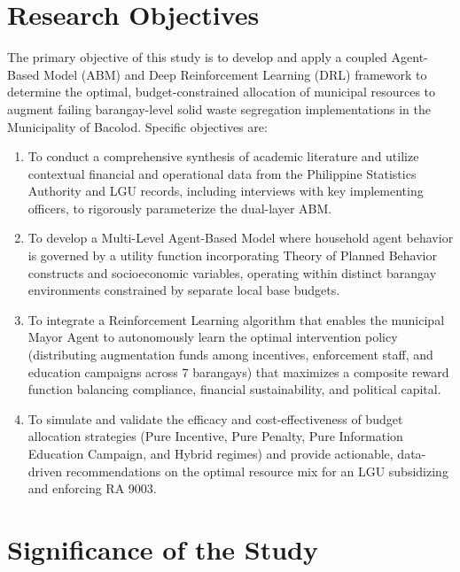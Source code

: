 \section{Research Objectives}

The primary objective of this study is to develop and apply a coupled Agent-Based Model (ABM) and Deep Reinforcement Learning (DRL) framework to determine the optimal, budget-constrained allocation of municipal resources to augment failing barangay-level solid waste segregation implementations in the Municipality of Bacolod. 
\noindent Specific objectives are:

\begin{enumerate}

    \item To conduct a comprehensive synthesis of academic literature and utilize contextual financial and operational data from the Philippine Statistics Authority and LGU records, including interviews with key implementing officers, to rigorously parameterize the dual-layer ABM.
    \item To develop a Multi-Level Agent-Based Model where household agent behavior is governed by a utility function incorporating Theory of Planned Behavior constructs and socioeconomic variables, operating within distinct barangay environments constrained by separate local base budgets.
    \item To integrate a Reinforcement Learning algorithm that enables the municipal Mayor Agent to autonomously learn the optimal intervention policy (distributing augmentation funds among incentives, enforcement staff, and education campaigns across 7 barangays) that maximizes a composite reward function balancing compliance, financial sustainability, and political capital.
    \item To simulate and validate the efficacy and cost-effectiveness of budget allocation strategies (Pure Incentive, Pure Penalty, Pure Information Education Campaign, and Hybrid regimes) and provide actionable, data-driven recommendations on the optimal resource mix for an LGU subsidizing and enforcing RA 9003.

\end{enumerate}

\section{Significance of the Study}

\setlength{\parindent}{2em} 

